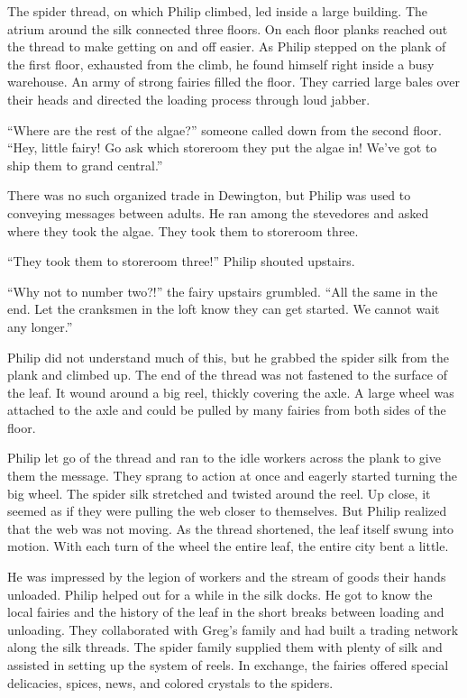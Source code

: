 \documentclass[10pt, draft]{memoir}
\begin{document}
The spider thread, on which Philip climbed, led inside a large building. The
atrium around the silk connected three floors. On each floor planks reached out
the thread to make getting on and off easier. As Philip stepped on the plank of
the first floor, exhausted from the climb, he found himself right inside a busy
warehouse. An army of strong fairies filled the floor. They carried large bales
over their heads and directed the loading process through loud jabber.

``Where are the rest of the algae?'' someone called down from the second floor.
``Hey, little fairy! Go ask which storeroom they put the algae in! We've got to
ship them to grand central.''

There was no such organized trade in Dewington, but Philip was used to
conveying messages between adults. He ran among the stevedores and asked where
they took the algae. They took them to storeroom three.

``They took them to storeroom three!'' Philip shouted upstairs.

``Why not to number two?!'' the fairy upstairs grumbled. ``All the same in the
end. Let the cranksmen in the loft know they can get started. We cannot wait
any longer.''

Philip did not understand much of this, but he grabbed the spider silk from the
plank and climbed up. The end of the thread was not fastened to the surface of
the leaf. It wound around a big reel, thickly covering the axle. A large wheel
was attached to the axle and could be pulled by many fairies from both sides of
the floor.

Philip let go of the thread and ran to the idle workers across the plank to
give them the message. They sprang to action at once and eagerly started
turning the big wheel. The spider silk stretched and twisted around the reel.
Up close, it seemed as if they were pulling the web closer to themselves. But
Philip realized that the web was not moving. As the thread shortened, the leaf
itself swung into motion. With each turn of the wheel the entire leaf, the
entire city bent a little.

He was impressed by the legion of workers and the stream of goods their hands
unloaded. Philip helped out for a while in the silk docks. He got to know the
local fairies and the history of the leaf in the short breaks between loading
and unloading. They collaborated with Greg's family and had built a trading
network along the silk threads. The spider family supplied them with plenty of
silk and assisted in setting up the system of reels. In exchange, the fairies
offered special delicacies, spices, news, and colored crystals to the spiders.
\end{document}
